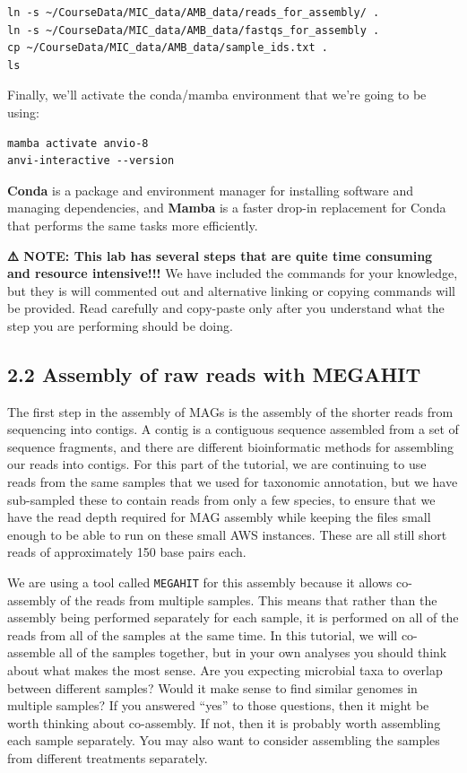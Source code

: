 \documentclass[
]{book}
\begin{document}
\begin{verbatim}
ln -s ~/CourseData/MIC_data/AMB_data/reads_for_assembly/ .
ln -s ~/CourseData/MIC_data/AMB_data/fastqs_for_assembly .
cp ~/CourseData/MIC_data/AMB_data/sample_ids.txt .
ls
\end{verbatim}

Finally, we'll activate the conda/mamba environment that we're going to be using:

\begin{verbatim}
mamba activate anvio-8
anvi-interactive --version
\end{verbatim}

\textbf{Conda} is a package and environment manager for installing software and managing dependencies, and \textbf{Mamba} is a faster drop-in replacement for Conda that performs the same tasks more efficiently.

\textbf{⚠️ NOTE: This lab has several steps that are quite time consuming and resource intensive!!!}
We have included the commands for your knowledge, but they is will commented out and alternative linking or copying commands will be provided. Read carefully and copy-paste only after you understand what the step you are performing should be doing.

\subsection{2.2 Assembly of raw reads with MEGAHIT}\label{assembly-of-raw-reads-with-megahit}

The first step in the assembly of MAGs is the assembly of the shorter reads from sequencing into contigs. A contig is a contiguous sequence assembled from a set of sequence fragments, and there are different bioinformatic methods for assembling our reads into contigs. For this part of the tutorial, we are continuing to use reads from the same samples that we used for taxonomic annotation, but we have sub-sampled these to contain reads from only a few species, to ensure that we have the read depth required for MAG assembly while keeping the files small enough to be able to run on these small AWS instances. These are all still short reads of approximately 150 base pairs each.

We are using a tool called \texttt{MEGAHIT} for this assembly because it allows co-assembly of the reads from multiple samples. This means that rather than the assembly being performed separately for each sample, it is performed on all of the reads from all of the samples at the same time. In this tutorial, we will co-assemble all of the samples together, but in your own analyses you should think about what makes the most sense. Are you expecting microbial taxa to overlap between different samples? Would it make sense to find similar genomes in multiple samples? If you answered ``yes'' to those questions, then it might be worth thinking about co-assembly. If not, then it is probably worth assembling each sample separately. You may also want to consider assembling the samples from different treatments separately.
\end{document}
